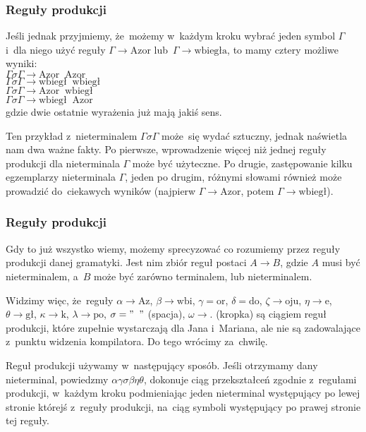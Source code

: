 \documentclass[10pt,t]{beamer}
\begin{document}
\begin{frame}
  \frametitle{Reguły produkcji}


  Jeśli jednak przyjmiemy, że~możemy w~każdym kroku wybrać \alert{jeden}
  symbol $\Gamma$ i~dla niego użyć reguły $\Gamma \to \text{Azor}$
  lub~$\Gamma \to \text{wbiegła}$, to mamy cztery możliwe wyniki: \\
  $\Gamma\sigma\Gamma \to \text{Azor} \; \; \text{Azor}$ \\
  $\Gamma\sigma\Gamma \to \text{wbiegł} \; \; \text{wbiegł}$ \\
  $\Gamma\sigma\Gamma \to \text{Azor} \; \; \text{wbiegł}$ \\
  $\Gamma\sigma\Gamma \to \text{wbiegł} \; \; \text{Azor}$ \\
  gdzie dwie ostatnie wyrażenia już mają jakiś sens.

  Ten przykład z~nieterminalem $\Gamma\sigma\Gamma$ może~się wydać sztuczny, jednak
  naświetla nam dwa ważne fakty. Po pierwsze, wprowadzenie więcej niż
  jednej reguły produkcji dla nieterminala $\Gamma$ może być użyteczne.
  Po drugie, zastępowanie kilku egzemplarzy nieterminala $\Gamma$,
  jeden po drugim, różnymi słowami również może prowadzić do~ciekawych
  wyników (najpierw $\Gamma \to \text{Azor}$, potem
  $\Gamma \to \text{wbiegł}$).

\end{frame}





\begin{frame}
  \frametitle{Reguły produkcji}


  Gdy to już wszystko wiemy, możemy sprecyzować co rozumiemy przez reguły
  produkcji danej gramatyki. Jest nim zbiór reguł postaci $A \to B$, gdzie
  $A$ \alert{musi} być nieterminalem, a~$B$ może być zarówno terminalem,
  lub nieterminalem.

  Widzimy więc, że~reguły $\alpha \to \text{Az}$, $\beta \to \text{wbi}$,
  $\gamma = \text{or}$, $\delta = \text{do}$, $\zeta \to \text{oju}$, $\eta \to \text{e}$,
  $\theta \to \text{gł}$, $\kappa \to \text{k}$, $\lambda \to \text{po}$, $\sigma = "\;\;"$
  (spacja), $\omega \to .$ (kropka) są ciągiem reguł produkcji, które zupełnie
  wystarczają dla Jana i~Mariana, ale nie są zadowalające z~punktu widzenia
  kompilatora. Do tego wrócimy za~chwilę.

  Reguł produkcji używamy w~następujący sposób. Jeśli otrzymamy dany
  nieterminal, powiedzmy $\alpha\gamma\sigma\beta\eta\theta$, dokonuje ciąg przekształceń zgodnie
  z~regułami produkcji, w~każdym kroku podmieniając \alert{jeden}
  nieterminal występujący po lewej stronie którejś z~reguły produkcji,
  na~ciąg symboli występujący po prawej stronie tej reguły.

\end{frame}
\end{document}
